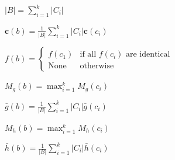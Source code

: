 \begin{centreditemize}

\item $\displaystyle |B| = \sum_{i=1}^k |C_i|$

\item $\displaystyle \mathbf{c}(b) = \frac{1}{|B|} \sum_{i=1}^k |C_i| \mathbf{c}(c_i)$

\item $f(b) = \left\{
\begin{array}{ll}
f(c_1) & \mbox{if all }f(c_i)\mbox{ are identical} \\
\mbox{None} & \mbox{otherwise}
\end{array}
\right.$

\item $\displaystyle M_g(b) = \max_{i=1}^k M_g(c_i)$

\item $\displaystyle \bar{g}(b) = \frac{1}{|B|} \sum_{i=1}^k |C_i| \bar{g}(c_i)$

\item $\displaystyle M_h(b) = \max_{i=1}^k M_h(c_i)$

\item $\displaystyle \bar{h}(b) = \frac{1}{|B|} \sum_{i=1}^k |C_i| \bar{h}(c_i)$

\end{centreditemize}

